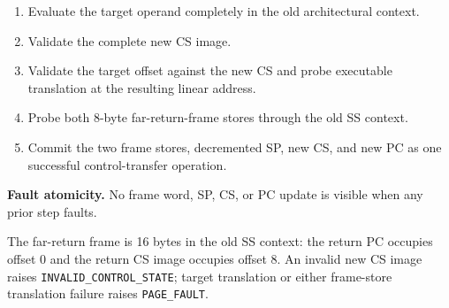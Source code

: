 \begin{enumerate}
\item Evaluate the target operand completely in the old architectural context.
\item Validate the complete new CS image.
\item Validate the target offset against the new CS and probe executable translation at the resulting linear address.
\item Probe both 8-byte far-return-frame stores through the old SS context.
\item Commit the two frame stores, decremented SP, new CS, and new PC as one successful control-transfer operation.
\end{enumerate}

\textbf{Fault atomicity.} No frame word, SP, CS, or PC update is visible when any prior step faults.

The far-return frame is 16 bytes in the old SS context: the return PC occupies offset 0 and the return CS image
occupies offset 8. An invalid new CS image raises \texttt{INVALID\_CONTROL\_STATE}; target translation or either
frame-store translation failure raises \texttt{PAGE\_FAULT}.
